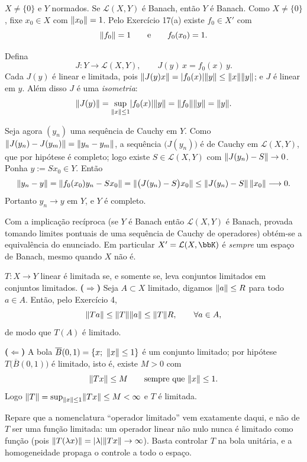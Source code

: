 \begin{exercicio}{$X\neq\{0\}$ e $Y$ normados. Se $\mathcal{L}(X,Y)$ é Banach, então $Y$ é Banach.}
\sol
Como $X\neq\{0\}$, fixe $x_0\in X$ com $\lVert x_0\rVert=1$. Pelo Exercício 17(a) existe $f_0\in X'$ com
\[ \lVert f_0\rVert=1 \qquad\text{e}\qquad f_0(x_0)=1. \]

Defina
\[ J:Y\to\mathcal{L}(X,Y),\qquad J(y)\,x=f_0(x)\,y . \]
Cada $J(y)$ é linear e limitada, pois $\lVert J(y)x\rVert=\lvert f_0(x)\rvert\lVert y\rVert\le\lVert x\rVert\lVert y\rVert$; e $J$ é linear em $y$. Além disso $J$ é uma \emph{isometria}:
\[ \lVert J(y)\rVert=\sup_{\lVert x\rVert\le1}\lvert f_0(x)\rvert\lVert y\rVert=\lVert f_0\rVert\lVert y\rVert=\lVert y\rVert. \]

Seja agora $(y_n)$ uma sequência de Cauchy em $Y$. Como $\lVert J(y_n)-J(y_m)\rVert=\lVert y_n-y_m\rVert$, a sequência $\bigl(J(y_n)\bigr)$ é de Cauchy em $\mathcal{L}(X,Y)$, que por hipótese é completo; logo existe $S\in\mathcal{L}(X,Y)$ com $\lVert J(y_n)-S\rVert\to0$. Ponha $y:=Sx_0\in Y$. Então
\[ \lVert y_n-y\rVert=\lVert f_0(x_0)y_n-Sx_0\rVert=\lVert\bigl(J(y_n)-S\bigr)x_0\rVert\le\lVert J(y_n)-S\rVert\,\lVert x_0\rVert\longrightarrow0. \]
Portanto $y_n\to y$ em $Y$, e $Y$ é completo.

\begin{obs}
Com a implicação recíproca (se $Y$ é Banach então $\mathcal{L}(X,Y)$ é Banach, provada tomando limites pontuais de uma sequência de Cauchy de operadores) obtém-se a equivalência do enunciado. Em particular $X'=\mathcal{L}(X,\K)$ é \emph{sempre} um espaço de Banach, mesmo quando $X$ não é.
\end{obs}
\end{exercicio}

\begin{exercicio}{$T:X\to Y$ linear é limitada se, e somente se, leva conjuntos limitados em conjuntos limitados.}
\sol
\textbf{($\Rightarrow$)} Seja $A\subset X$ limitado, digamos $\lVert a\rVert\le R$ para todo $a\in A$. Então, pelo Exercício 4,
\[ \lVert Ta\rVert\le\lVert T\rVert\lVert a\rVert\le\lVert T\rVert R,\qquad \forall a\in A, \]
de modo que $T(A)$ é limitado.

\textbf{($\Leftarrow$)} A bola $\overline{B}(0,1)=\{x;\ \norm{x}\le1\}$ é um conjunto limitado; por hipótese $T\bigl(\overline{B}(0,1)\bigr)$ é limitado, isto é, existe $M>0$ com
\[ \lVert Tx\rVert\le M \qquad\text{sempre que } \lVert x\rVert\le1. \]
Logo $\lVert T\rVert=\sup_{\lVert x\rVert\le1}\lVert Tx\rVert\le M<\infty$ e $T$ é limitada.

\begin{obs}
Repare que a nomenclatura ``operador limitado'' vem exatamente daqui, e não de $T$ ser uma função limitada: um operador linear não nulo nunca é limitado como função (pois $\lVert T(\lambda x)\rVert=\lvert\lambda\rvert\lVert Tx\rVert\to\infty$). Basta controlar $T$ na bola unitária, e a homogeneidade propaga o controle a todo o espaço.
\end{obs}
\end{exercicio}

